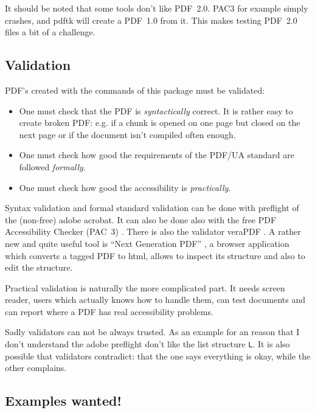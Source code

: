 \documentclass[DIV=12,parskip=half-,bibliography=totoc]{scrartcl}
\newcommand\PDF{PDF}
\begin{document}
It should be noted that some tools don't like \PDF{}~2.0.  PAC3 for example simply crashes, and pdftk will create a \PDF{}~1.0 from it. This makes testing \PDF{}~2.0 files a bit of a challenge.

\subsection{Validation}


\PDF{}'s created with the commands of this package must be validated:

\begin{itemize}
\item
 One must check that the \PDF{} is \emph{syntactically} correct. It is rather easy to create broken \PDF{}:
 e.g. if a chunk is opened on one page but closed on the next page or if the document isn't compiled often enough.

\item
One must check how good the requirements of the PDF/UA standard are followed \emph{formally}.

\item
One must check how good the accessibility is \emph{practically}.
\end{itemize}


Syntax validation and formal standard validation can be done with preflight of the (non-free) adobe acrobat.
It can also be done also with the free \PDF{} Accessibility Checker (PAC~3) \parencite{pac3}.
There is also the validator veraPDF \parencite{verapdf}.
A rather new and quite useful tool is \enquote{Next Generation PDF} \parencite{ngpdf}, a browser application which converts a tagged PDF to html, allows to inspect its structure and also to edit the structure.

Practical validation is naturally the more complicated part. It needs screen reader, users which actually knows how to handle them, can test documents and can report where a \PDF{} has real accessibility problems.



Sadly validators can not be always trusted. As an example for an reason that I don't understand the adobe preflight don't like the list structure \texttt{L}.
It is also possible that validators contradict: that the one says everything is okay, while the other complains.



\subsection{Examples wanted!}
\end{document}

